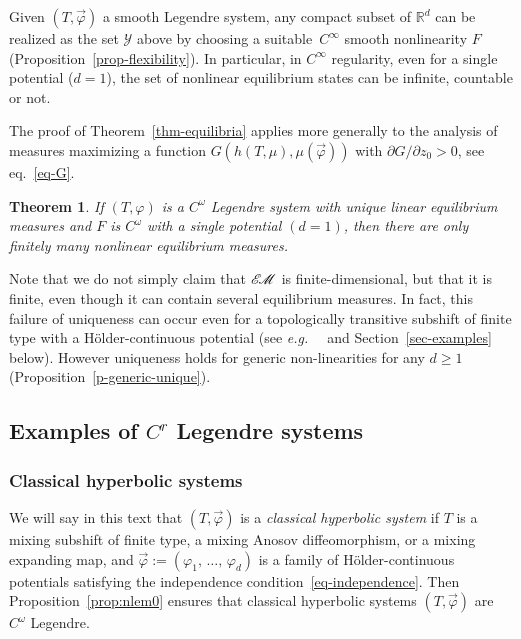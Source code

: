 \documentclass[AHL, Unicode, longabstracts,published]{cedram}
\theoremstyle{plain}
\newtheorem{theol}{Theorem}
\theoremstyle{plain}
\newcommand*\eg{{\it e.g.\ }}
\newcommand\vpot{\vec\pot}
\newcommand{\EM}{\mathscr{E\kern-2pt M}}
\newcommand{\pot}{\varphi}
\newcounter{In}
\newcommand*\8{\infty}
\newcommand\RR{\mathbb{R}}
\newcommand{\scY}{\mathscr{Y}}
\begin{document}
\begin{rema}
Given $(T,\vpot)$ a smooth Legendre system, any compact subset of $\RR^d$ can be realized as the set $\scY$ above by choosing a suitable~$C^\infty$ smooth nonlinearity $F$ (Proposition~\ref{prop-flexibility}). In particular, in $C^\infty$ regularity, even for a single potential ($d=1$), the set of nonlinear equilibrium states can be infinite, countable or not.
\end{rema}

\begin{rema}
The proof of Theorem~\ref{thm-equilibria} applies more generally to the analysis of measures maximizing a function $G(h(T,\mu),\mu(\vec\pot))$ with $\partial G/\partial z_0>0$, see eq.~\eqref{eq-G}.
\end{rema}
%

\begin{theol}\label{thm-finiteness}
If $(T,\pot)$ is a $C^\omega$ Legendre system with unique linear equilibrium measures and $F$ is $C^\omega$ with a single potential $(d=1)$, then there are only finitely many nonlinear equilibrium measures.
\end{theol}

Note that we do not simply claim that $\EM$ is finite-dimensional, but that it is finite, even though it can contain several equilibrium measures. In fact, this failure of uniqueness can occur even for a topologically transitive subshift of finite type with a H\"older-continuous potential (see \eg~\cite{Leplaideur-Watbled} and Section~\ref{sec-examples} below). However uniqueness holds for generic non-linearities for any $d\ge1$ (Proposition~\ref{p-generic-unique}).


\subsection{Examples of \texorpdfstring{$C^r$}{Cr} Legendre systems}\label{sec-examples-sys}

\subsubsection{Classical hyperbolic systems}

We will say in this text that $(T,\vec\pot)$ is a \emph{classical hyperbolic system} if $T$ is a mixing subshift of finite type, a mixing Anosov diffeomorphism, or a mixing expanding map, and $\vec\pot:=(\pot_1,\,\dots,\,\pot_d)$ is a family of H\"older-continuous potentials satisfying the independence condition~\eqref{eq-independence}. Then Proposition~\ref{prop:nlem0} ensures that classical hyperbolic systems $(T,\vec\pot)$ are $C^\omega$ Legendre.
\end{document}
